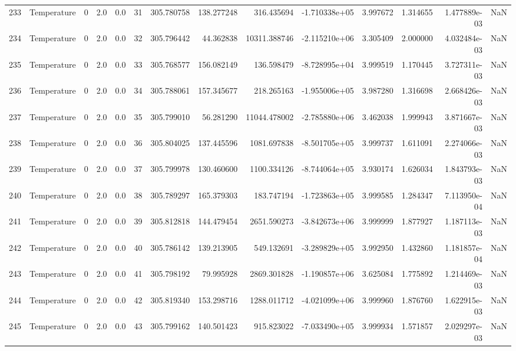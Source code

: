 \begin{tabular}{llrrrrrrrrrrrr}
233 &  Temperature &       0 &  2.0 &  0.0 &   31 &  305.780758 &   138.277248 &     316.435694 & -1.710338e+05 &  3.997672 &  1.314655 &  1.477889e-03 &      NaN \\
234 &  Temperature &       0 &  2.0 &  0.0 &   32 &  305.796442 &    44.362838 &   10311.388746 & -2.115210e+06 &  3.305409 &  2.000000 &  4.032484e-03 &      NaN \\
235 &  Temperature &       0 &  2.0 &  0.0 &   33 &  305.768577 &   156.082149 &     136.598479 & -8.728995e+04 &  3.999519 &  1.170445 &  3.727311e-03 &      NaN \\
236 &  Temperature &       0 &  2.0 &  0.0 &   34 &  305.788061 &   157.345677 &     218.265163 & -1.955006e+05 &  3.987280 &  1.316698 &  2.668426e-03 &      NaN \\
237 &  Temperature &       0 &  2.0 &  0.0 &   35 &  305.799010 &    56.281290 &   11044.478002 & -2.785880e+06 &  3.462038 &  1.999943 &  3.871667e-03 &      NaN \\
238 &  Temperature &       0 &  2.0 &  0.0 &   36 &  305.804025 &   137.445596 &    1081.697838 & -8.501705e+05 &  3.999737 &  1.611091 &  2.274066e-03 &      NaN \\
239 &  Temperature &       0 &  2.0 &  0.0 &   37 &  305.799978 &   130.460600 &    1100.334126 & -8.744064e+05 &  3.930174 &  1.626034 &  1.843793e-03 &      NaN \\
240 &  Temperature &       0 &  2.0 &  0.0 &   38 &  305.789297 &   165.379303 &     183.747194 & -1.723863e+05 &  3.999585 &  1.284347 &  7.113950e-04 &      NaN \\
241 &  Temperature &       0 &  2.0 &  0.0 &   39 &  305.812818 &   144.479454 &    2651.590273 & -3.842673e+06 &  3.999999 &  1.877927 &  1.187113e-03 &      NaN \\
242 &  Temperature &       0 &  2.0 &  0.0 &   40 &  305.786142 &   139.213905 &     549.132691 & -3.289829e+05 &  3.992950 &  1.432860 &  1.181857e-04 &      NaN \\
243 &  Temperature &       0 &  2.0 &  0.0 &   41 &  305.798192 &    79.995928 &    2869.301828 & -1.190857e+06 &  3.625084 &  1.775892 &  1.214469e-03 &      NaN \\
244 &  Temperature &       0 &  2.0 &  0.0 &   42 &  305.819340 &   153.298716 &    1288.011712 & -4.021099e+06 &  3.999960 &  1.876760 &  1.622915e-03 &      NaN \\
245 &  Temperature &       0 &  2.0 &  0.0 &   43 &  305.799162 &   140.501423 &     915.823022 & -7.033490e+05 &  3.999934 &  1.571857 &  2.029297e-03 &      NaN \\

\end{tabular}
